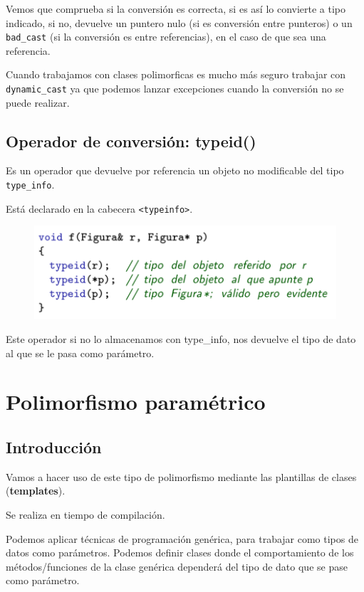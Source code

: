 Vemos que comprueba si la conversión es correcta, si es así lo convierte a tipo indicado, si no, devuelve un puntero nulo (si es conversión entre punteros) o un \texttt{bad\_cast} (si la conversión es entre referencias), en el caso de que sea una referencia.

Cuando trabajamos con clases polimorficas es mucho más seguro trabajar con \texttt{dynamic\_cast} ya que podemos lanzar excepciones cuando la conversión no se puede realizar.

\subsection{Operador de conversión: typeid()}

Es un operador que devuelve por referencia un objeto no modificable del tipo \texttt{type\_info}.

Está declarado en la cabecera \texttt{<typeinfo>}.

\begin{figure}[h]
	\begin{center}
		\includegraphics[width=\textwidth]{Imagenes/poli11.png}
	\end{center}
\end{figure}

Este operador si no lo almacenamos con type\_info, nos devuelve el tipo de dato al que se le pasa como parámetro.

\newpage
\section{Polimorfismo paramétrico}

\subsection{Introducción}

Vamos a hacer uso de este tipo de polimorfismo mediante las plantillas de clases (\textbf{templates}).

Se realiza en tiempo de compilación.

Podemos aplicar técnicas de programación genérica, para trabajar como tipos de datos como parámetros. Podemos definir clases donde el comportamiento de los métodos/funciones de la clase genérica dependerá del tipo de dato que se pase como parámetro.

